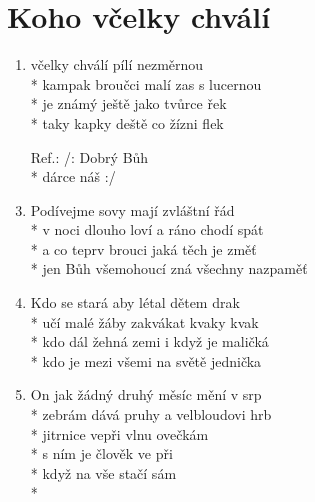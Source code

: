 \section{Koho včelky chválí}
\begin{enumerate}
\item {} včelky chválí pílí             nezměrnou \\*
kampak broučci malí zas  s lucernou \\*
 je známý ještě jako tvůrce řek \\*
taky kapky deště co  žízni flek 
\item[Ref.:] /: Dobrý     Bůh   \\*
  dárce  náš  :/ 
\item Podívejme sovy mají zvláštní řád \\*
v noci dlouho loví a ráno chodí spát \\*
a co teprv brouci jaká těch je změť \\*
jen Bůh všemohoucí zná všechny nazpaměť 
\item Kdo se stará aby létal dětem drak \\*
učí malé žáby zakvákat kvaky kvak \\*
kdo dál žehná zemi i když je maličká \\*
kdo je mezi všemi na světě jednička 
\item On jak žádný druhý měsíc mění v srp \\*
zebrám dává pruhy a velbloudovi hrb \\*
jitrnice vepři vlnu ovečkám \\*
s ním je člověk ve při \\*
když na vše stačí sám \\*
\end{enumerate}
